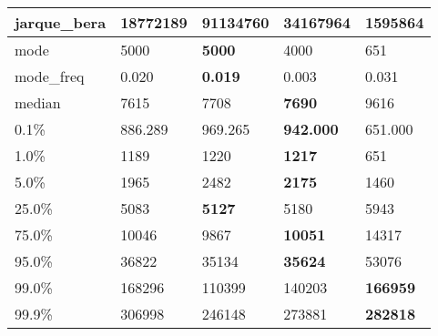 \begin{table}[H]
\begin{tabular}{|l|m{10em}|m{10em}|m{10em}|m{10em}|}
\hline jarque\_bera & 18772189 & \cellcolor[rgb]{0.9, 0.54, 0.52} 91134760 & \bfseries 34167964 & 1595864 \\
\hline mode & 5000 & \bfseries 5000 & 4000 & \cellcolor[rgb]{0.9, 0.54, 0.52} 651 \\
\hline mode\_freq & 0.020 & \bfseries 0.019 & \cellcolor[rgb]{0.9, 0.54, 0.52} 0.003 & 0.031 \\
\hline median & 7615 & 7708 & \bfseries 7690 & \cellcolor[rgb]{0.9, 0.54, 0.52} 9616 \\
\hline 0.1\% & 886.289 & 969.265 & \bfseries 942.000 & \cellcolor[rgb]{0.9, 0.54, 0.52} 651.000 \\
\hline 1.0\% & 1189 & 1220 & \bfseries 1217 & \cellcolor[rgb]{0.9, 0.54, 0.52} 651 \\
\hline 5.0\% & 1965 & \cellcolor[rgb]{0.9, 0.54, 0.52} 2482 & \bfseries 2175 & 1460 \\
\hline 25.0\% & 5083 & \bfseries 5127 & 5180 & \cellcolor[rgb]{0.9, 0.54, 0.52} 5943 \\
\hline 75.0\% & 10046 & 9867 & \bfseries 10051 & \cellcolor[rgb]{0.9, 0.54, 0.52} 14317 \\
\hline 95.0\% & 36822 & 35134 & \bfseries 35624 & \cellcolor[rgb]{0.9, 0.54, 0.52} 53076 \\
\hline 99.0\% & 168296 & \cellcolor[rgb]{0.9, 0.54, 0.52} 110399 & 140203 & \bfseries 166959 \\
\hline 99.9\% & 306998 & \cellcolor[rgb]{0.9, 0.54, 0.52} 246148 & 273881 & \bfseries 282818 \\
\hline
\end{tabular}
\end{table}

